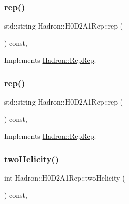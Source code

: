 \subsubsection{\texorpdfstring{rep()}{rep()}\hspace{0.1cm}{\footnotesize\ttfamily [2/3]}}
{\footnotesize\ttfamily std\+::string Hadron\+::\+H0\+D2\+A1\+Rep\+::rep (\begin{DoxyParamCaption}{ }\end{DoxyParamCaption}) const\hspace{0.3cm}{\ttfamily [inline]}, {\ttfamily [virtual]}}



Implements \mbox{\hyperlink{structHadron_1_1RepRep_ab3213025f6de249f7095892109575fde}{Hadron\+::\+Rep\+Rep}}.

\mbox{\label{structHadron_1_1H0D2A1Rep_ac7e30eadba7f3a5049f2bde305ca28c5}} 
\subsubsection{\texorpdfstring{rep()}{rep()}\hspace{0.1cm}{\footnotesize\ttfamily [3/3]}}
{\footnotesize\ttfamily std\+::string Hadron\+::\+H0\+D2\+A1\+Rep\+::rep (\begin{DoxyParamCaption}{ }\end{DoxyParamCaption}) const\hspace{0.3cm}{\ttfamily [inline]}, {\ttfamily [virtual]}}



Implements \mbox{\hyperlink{structHadron_1_1RepRep_ab3213025f6de249f7095892109575fde}{Hadron\+::\+Rep\+Rep}}.

\mbox{\label{structHadron_1_1H0D2A1Rep_a222dee2dd348d1c79d09ae173d2c2b6f}} 
\subsubsection{\texorpdfstring{twoHelicity()}{twoHelicity()}\hspace{0.1cm}{\footnotesize\ttfamily [1/2]}}
{\footnotesize\ttfamily int Hadron\+::\+H0\+D2\+A1\+Rep\+::two\+Helicity (\begin{DoxyParamCaption}{ }\end{DoxyParamCaption}) const\hspace{0.3cm}{\ttfamily [inline]}, {\ttfamily [virtual]}}

